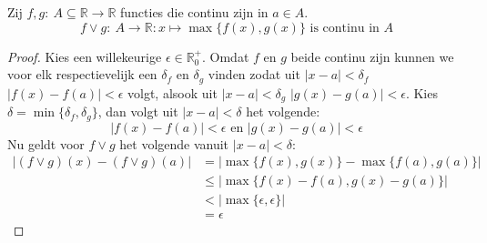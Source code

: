 \documentclass[main.tex]{subfiles}
\begin{document}
\begin{st}
  Zij $f,g:\ A \subseteq \mathbb{R} \rightarrow \mathbb{R}$ functies die continu zijn in $a\in A$.
  \[ f \vee g:\ A \rightarrow \mathbb{R}: x \mapsto \max\{f(x),g(x)\} \text{ is continu in } A \]

  \begin{proof}
    Kies een willekeurige $\epsilon \in \mathbb{R}_{0}^{+}$.
    Omdat $f$ en $g$ beide continu zijn kunnen we voor elk respectievelijk een $\delta_{f}$ en $\delta_{g}$ vinden zodat uit $|x-a| < \delta_{f}$ $|f(x)-f(a)|< \epsilon$ volgt, alsook uit $|x-a|<\delta_{g}$ $|g(x)-g(a)|<\epsilon$.
    Kies $\delta = \min\{ \delta_{f},\delta_{g} \}$, dan volgt uit $|x-a|< \delta$ het volgende:
    \[ |f(x)-f(a)| < \epsilon \text{ en } |g(x)-g(a)| < \epsilon \]
    Nu geldt voor $f\vee g$ het volgende vanuit $|x-a|< \delta$:
    \[
    \begin{array}{rl}
      |(f\vee g)(x)-(f\vee g)(a)| &=
      |\max\{f(x),g(x)\}- \max\{f(a),g(a)\}|\\
      &\le |\max\{f(x)-f(a),g(x)-g(a)\}|\\
      &< |\max\{\epsilon,\epsilon\}|\\
      &= \epsilon
    \end{array}
    \]
  \end{proof}
\end{st}
\end{document}
